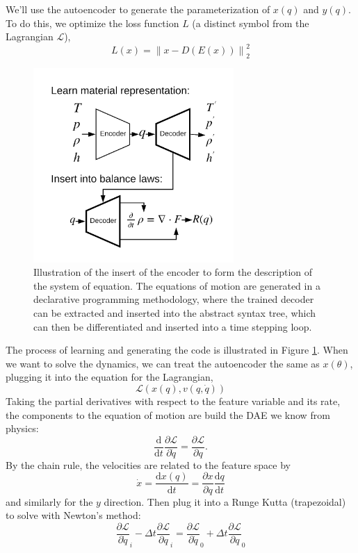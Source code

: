 \documentclass[]{article}
\begin{document}
We'll use the autoencoder to generate the parameterization of \(x(q)\)
and \(y(q)\). To do this, we optimize the loss function $L$ (a
distinct symbol from the Lagrangian $\mathcal{L}$),
\begin{equation}
L(x) = \left\| x-D(E(x)) \right\|_2^2
\end{equation}

\begin{figure}
  \center
\includegraphics[width=3in]{../figures/autoencoder_balance.png}
  \caption{\label{fig:balance}Illustration of the insert of the encoder to form the
  description of the system of equation. The equations
  of motion are generated in a declarative programming methodology,
  where the trained decoder can be extracted and inserted into the abstract
  syntax tree, which can then be differentiated and inserted into a
  time stepping loop.}
\end{figure}

The process of learning and generating the code is illustrated in
Figure \ref{fig:balance}.
When we want to solve the dynamics, we can treat the autoencoder the
same as \(x(\theta)\), plugging it into the equation for the Lagrangian,
\begin{equation}
  \mathcal{L}(x(q),v(q,\dot{q}))
\end{equation}
Taking the partial derivatives with respect to the feature variable and
its rate, the components to the equation of motion are build the DAE we know from physics:
\begin{equation}
  \frac{\mathrm{d}}{\mathrm{d}t}\frac{\partial \mathcal{L}}{\partial \dot{q}} =
  \frac{\partial \mathcal{L}}{\partial q}.
\end{equation}
By the chain rule, the velocities are related to the
feature space by
\begin{equation}
\dot{x} = \frac{\mathrm{d}x(q)}{\mathrm{d}t} = \frac{\partial x}{\partial q}\frac{\mathrm{d}q}{\mathrm{d}t}
\end{equation}
and similarly for the \(y\) direction.
Then plug it into a Runge Kutta (trapezoidal) to solve with Newton's
method:
\begin{equation}
\frac{\partial \mathcal{L}}{\partial \dot{q}}_i - \Delta t
\frac{\partial \mathcal{L}}{\partial q}_i = \frac{\partial
  \mathcal{L}}{\partial \dot{q}}_0 + \Delta t \frac{\partial
  \mathcal{L}}{\partial q}_0
\end{equation}
\end{document}
